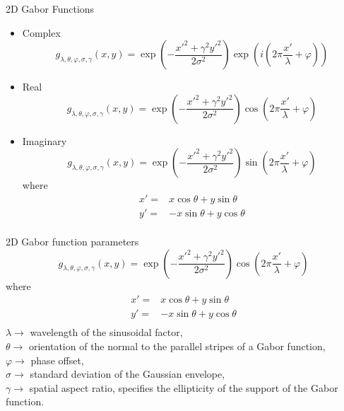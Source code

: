 \begin{frame}{2D Gabor Functions}
\begin{itemize}
\item Complex
\begin{equation}
{g_{\lambda ,\theta ,\varphi ,\sigma ,\gamma }}(x,y) = \exp \left( { - \frac{{x{'^2} + {\gamma ^2}y{'^2}}}{{2{\sigma ^2}}}} \right)\exp \left( i\left({2\pi \frac{{x'}}{\lambda } + \varphi }\right) \right)\nonumber
\end{equation}
\item Real
\begin{equation}
{g_{\lambda ,\theta ,\varphi ,\sigma ,\gamma }}(x,y) = \exp \left( { - \frac{{x{'^2} + {\gamma ^2}y{'^2}}}{{2{\sigma ^2}}}} \right)\cos \left( {2\pi \frac{{x'}}{\lambda } + \varphi } \right)\nonumber
\end{equation}
\item Imaginary
\begin{equation}
{g_{\lambda ,\theta ,\varphi ,\sigma ,\gamma }}(x,y) = \exp \left( { - \frac{{x{'^2} + {\gamma ^2}y{'^2}}}{{2{\sigma ^2}}}} \right)\sin \left( {2\pi \frac{{x'}}{\lambda } + \varphi } \right)\nonumber
\end{equation}
where
\begin{align*}
x'=&x\cos \theta +y\sin \theta\\
y'=&-x\sin \theta +y\cos \theta\\
\end{align*}
\end{itemize}
\end{frame}
\begin{frame}{2D Gabor function parameters}
\begin{equation}
{g_{\lambda ,\theta ,\varphi ,\sigma ,\gamma }}(x,y) = \exp \left( { - \frac{{x{'^2} + {\gamma ^2}y{'^2}}}{{2{\sigma ^2}}}} \right)\cos \left( {2\pi \frac{{x'}}{\lambda } + \varphi } \right)\nonumber
\end{equation}
where
\begin{align*}
x'=&x\cos \theta +y\sin \theta\\
y'=&-x\sin \theta +y\cos \theta\\
\end{align*}
$\lambda\rightarrow$ wavelength of the sinusoidal factor,\\
$\theta\rightarrow$ orientation of the normal to the parallel stripes of a Gabor function,\\
$\varphi\rightarrow$ phase offset,\\
$\sigma\rightarrow$ standard deviation of the Gaussian envelope,\\
$\gamma\rightarrow$ spatial aspect ratio, specifies the ellipticity of the support of the Gabor function.
\end{frame}

